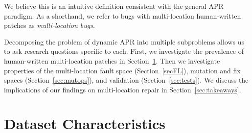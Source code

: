\documentclass[10pt, conference]{IEEEtran}
\begin{document}
We believe this is an intuitive definition consistent with the general APR
paradigm. As a shorthand, we refer to bugs with multi-location human-written
patches as \emph{multi-location bugs}.

Decomposing the problem of dynamic APR into multiple subproblems allows us to
ask research questions specific to each. First, we investigate the prevalence of
human-written multi-location patches in Section~\ref{sec:data-rq1}.  Then we
investigate properties of the multi-location fault space (Section~\ref{secFL}),
mutation and fix spaces (Section~\ref{sec:mutops}), and validation
(Section~\ref{sec:tests}). We discuss the implications of our findings on
multi-location repair in Section~\ref{sec:takeaways}.

\section{Dataset Characteristics}
\label{sec:data-rq1}
\end{document}
